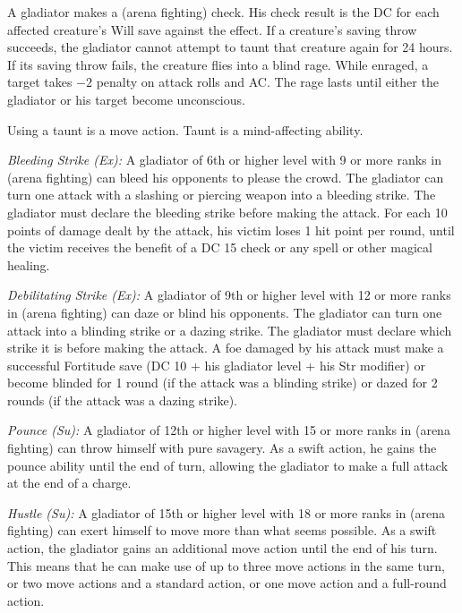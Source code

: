 A gladiator makes a  (arena fighting) check. His check result is the DC for each affected creature's Will save against the effect. If a creature's saving throw succeeds, the gladiator cannot attempt to taunt that creature again for 24 hours. If its saving throw fails, the creature flies into a blind rage. While enraged, a target takes $-2$ penalty on attack rolls and AC. The rage lasts until either the gladiator or his target become unconscious.

Using a taunt is a move action. Taunt is a mind-affecting ability.

\textit{Bleeding Strike (Ex):} A gladiator of 6th or higher level with 9 or more ranks in  (arena fighting) can bleed his opponents to please the crowd. The gladiator can turn one attack with a slashing or piercing weapon into a bleeding strike. The gladiator must declare the bleeding strike before making the attack. For each 10 points of damage dealt by the attack, his victim loses 1 hit point per round, until the victim receives the benefit of a DC 15  check or any  spell or other magical healing.

\textit{Debilitating Strike (Ex):} A gladiator of 9th or higher level with 12 or more ranks in  (arena fighting) can daze or blind his opponents. The gladiator can turn one attack into a blinding strike or a dazing strike. The gladiator must declare which strike it is before making the attack. A foe damaged by his attack must make a successful Fortitude save (DC 10 + \onehalf his gladiator level + his Str modifier) or become blinded for 1 round (if the attack was a blinding strike) or dazed for 2 rounds (if the attack was a dazing strike).

\textit{Pounce (Su):} A gladiator of 12th or higher level with 15 or more ranks in  (arena fighting) can throw himself with pure savagery. As a swift action, he gains the pounce ability until the end of turn, allowing the gladiator to make a full attack at the end of a charge.

\textit{Hustle (Su):} A gladiator of 15th or higher level with 18 or more ranks in  (arena fighting) can exert himself to move more than what seems possible. As a swift action, the gladiator gains an additional move action until the end of his turn. This means that he can make use of up to three move actions in the same turn, or two move actions and a standard action, or one move action and a full-round action.

